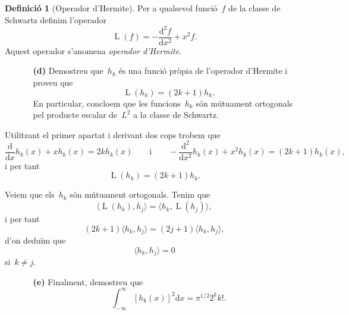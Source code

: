 \documentclass[a4paper]{article}
\theoremstyle{plain}
\theoremstyle{definition}
\newtheorem{definition}{Definició}
\DeclareMathOperator{\Lop}{L}
\providecommand{\uppi}{\pi}
\newcommand{\diff}{\mathrm{d}}
\begin{document}
\begin{definition}[Operador d'Hermite]
    Per a qualsevol funció~\(f\) de la classe de Schwartz definim l'operador
    \[
        \Lop(f) = -\frac{\diff^{2} f}{\diff x^{2}} + x^{2}f.
    \]
    Aquest operador s'anomena \emph{operador d'Hermite}.
\end{definition}

\begin{enumerate}
    \item[]\begin{enumerate}
        \item[\textbf{(d)}] Demostreu que~\(h_{k}\) és una funció pròpia de
            l'operador d'Hermite i proveu que
            \[
                \Lop(h_{k}) = (2k+1)h_{k}.
            \]
            En particular, concloem que les funcions~\(h_{k}\) són mútuament
            ortogonals pel producte escalar de~\(L^{2}\) a la classe de
            Schwartz.
    \end{enumerate}
\end{enumerate}

Utilitzant el primer apartat i derivant dos cops trobem que
\[
    \frac{\diff}{\diff x}
    h_{k}(x)
    +
    x
    h_{k}(x)
    =
    2k
    h_{k}(x)
    \qquad\text{i}\qquad
    -\frac{\diff^{2}}{\diff x^{2}}
    h_{k}(x)
    +
    x^{2}
    h_{k}(x)
    =
    (2k + 1)
    h_{k}(x),
\]
i per tant
\[
    \Lop(h_{k})
    =
    (2k+1)
    h_{k}.
\]

Veiem que els~\(h_{k}\) són mútuament ortogonals. Tenim que
\[
    \langle \Lop(h_{k}), h_{j}\rangle
    =
    \langle h_{k}, \Lop(h_{j})\rangle,
\]
i per tant
\[
    (2k+1)\langle h_{k},h_{j}\rangle
    =
    (2j+1)\langle h_{k},h_{j}\rangle,
\]
d'on deduïm que
\[
    \langle h_{k},h_{j}\rangle = 0
\]
si~\(k\neq j\).

\begin{enumerate}
    \item[]\begin{enumerate}
        \item[\textbf{(e)}] Finalment, demostreu que
            \[
                \int_{-\infty}^{\infty}
                [h_{k}(x)]^{2}\diff x
                =
                \uppi^{1/2}2^{k}k!.
            \]
    \end{enumerate}
\end{enumerate}
\end{document}
